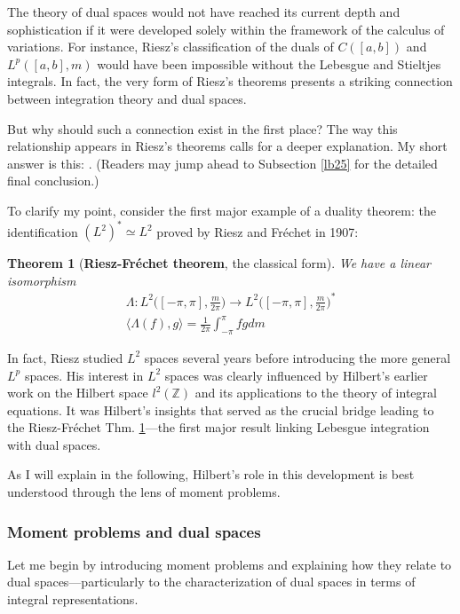 \documentclass[12pt,b5paper,notitlepage]{article}
\theoremstyle{definition}
\theoremstyle{plain}
\newtheorem{thm}[df]{Theorem}
\newcommand{\bk}[1]{\langle {#1}\rangle}
\newcommand{\Zbb}{\mathbb Z}
\numberwithin{equation}{section}
\begin{document}
The theory of dual spaces would not have reached its current depth and sophistication if it were developed solely within the framework of the calculus of variations. For instance, Riesz’s classification of the duals of $C([a,b])$ and $L^p([a,b],m)$ would have been impossible without the Lebesgue and Stieltjes integrals. In fact, the very form of Riesz’s theorems presents a striking connection between integration theory and  dual spaces.

But why should such a connection exist in the first place? The way this relationship appears in Riesz’s theorems calls for a deeper explanation.  My short answer is this: . (Readers may jump ahead to Subsection \ref{lb25} for the detailed final conclusion.)

To clarify my point, consider the first major example of a duality theorem: the identification $(L^2)^*\simeq L^2$ proved by Riesz and Fr\'echet in 1907:

\begin{thm}[\textbf{Riesz-Fr\'echet theorem}, the classical form]\label{lb15}  
We have a linear isomorphism
\begin{gather*}
\Lambda:L^2\big([-\pi,\pi],\frac m{2\pi}\big)\rightarrow L^2\big([-\pi,\pi],\frac m{2\pi}\big)^*\\
\bk{\Lambda(f),g}=\frac 1{2\pi}\int_{-\pi}^\pi fgdm
\end{gather*}
\end{thm}
In fact, Riesz studied $L^2$ spaces several years before introducing the more general $L^p$ spaces. His interest in $L^2$ spaces was clearly influenced by Hilbert’s earlier work on the Hilbert space $l^2(\Zbb)$ and its applications to the theory of integral equations. It was Hilbert’s insights that served as the crucial bridge leading to the Riesz-Fr\'echet Thm. \ref{lb15}---the first major result linking Lebesgue integration with dual spaces. 

As I will explain in the following, Hilbert’s role in this development is best understood through the lens of moment problems.


\subsubsection{Moment problems and dual spaces}\label{lb202}


Let me begin by introducing moment problems and explaining how they relate to dual spaces---particularly to the characterization of dual spaces in terms of integral representations.
\end{document}
